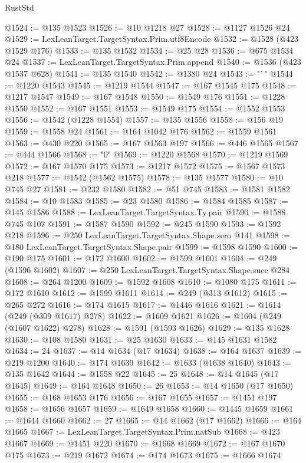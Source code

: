 \begin{lexlean}{RustStd}
\begin{coremodule}
{\begin{coremodule}
{{{{{{{{{{{{{{{{{{{{{{{{{{{{{{{{{{@1524 := @135 @1523
@1526 := @10 @1218 @27
@1528 := @1127 @1526 @24
@1529 := LexLeanTarget.TargetSyntax.Prim.utf8Encode
@1532 := @1528 (@423 @1529 @176)
@1533 := @135 @1532
@1534 := @25 @28
@1536 := @675 @1534 @24
@1537 := LexLeanTarget.TargetSyntax.Prim.append
@1540 := @1536 (@423 @1537 @628)
@1541 := @135 @1540
@1542 := @1380 @24
@1543 := "`"
@1544 := @1220 @1543
@1545 := @1219 @1544
@1547 := @167 @1545 @175
@1548 := @1217 @1547
@1549 := @167 @1548
@1550 := @1549 @176
@1551 := @1228 @1550
@1552 := @167 @1551
@1553 := @1549 @175
@1554 := @1552 @1553
@1556 := @1542 (@1228 @1554)
@1557 := @135 @1556
@1558 := @156 @19
@1559 := @1558 @24
@1561 := @164 @1042 @176
@1562 := @1559 @1561
@1563 := @430 @220
@1565 := @167 @1563 @197
@1566 := @446 @1565
@1567 := @444 @1566
@1568 := "0"
@1569 := @1220 @1568
@1570 := @1219 @1569
@1572 := @167 @1570 @175
@1573 := @1217 @1572
@1575 := @1567 @1573 @218
@1577 := @1542 (@1562 @1575)
@1578 := @135 @1577
@1580 := @10 @745 @27
@1581 := @232 @1580
@1582 := @51 @745
@1583 := @1581 @1582
@1584 := @10 @1583
@1585 := @23 @1580
@1586 := @1584 @1585
@1587 := @145 @1586
@1588 := LexLeanTarget.TargetSyntax.Ty.pair
@1590 := @1588 @745 @107
@1591 := @1587 @1590
@1592 := @245 @1590
@1593 := @1592 @218
@1596 := @250 LexLeanTarget.TargetSyntax.Shape.zero @141
@1598 := @180 LexLeanTarget.TargetSyntax.Shape.pair
@1599 := @1598 @1590
@1600 := @190 @175
@1601 := @172 @1600
@1602 := @1599 @1601
@1604 := @249 (@1596 @1602)
@1607 := @250 LexLeanTarget.TargetSyntax.Shape.succ @284
@1608 := @264 @1200
@1609 := @1592 @1608
@1610 := @1080 @175
@1611 := @172 @1610
@1612 := @1599 @1611
@1614 := @249 (@313 @1612)
@1615 := @265 @272
@1616 := @174 @1615
@1617 := @1446 @1616
@1621 := @1614 (@249 (@309 @1617) @278)
@1622 := @1609 @1621
@1626 := @1604 (@249 (@1607 @1622) @278)
@1628 := @1591 (@1593 @1626)
@1629 := @135 @1628
@1630 := @108 @1580
@1631 := @25 @1630
@1633 := @145 @1631 @1582
@1634 := 24
@1637 := @14 @1634 (@17 @1634)
@1638 := @164 @1637
@1639 := @219 @1200
@1640 := @174 @1639
@1642 := @1633 (@1638 @1640)
@1643 := @135 @1642
@1644 := @1558 @22
@1645 := 25
@1648 := @14 @1645 (@17 @1645)
@1649 := @164 @1648
@1650 := 26
@1653 := @14 @1650 (@17 @1650)
@1655 := @168 @1653 @176
@1656 := @167 @1655
@1657 := @1451 @197
@1658 := @1656 @1657
@1659 := @1649 @1658
@1660 := @1445 @1659
@1661 := @1644 @1660
@1662 := 27
@1665 := @14 @1662 (@17 @1662)
@1666 := @164 @1665
@1667 := LexLeanTarget.TargetSyntax.Prim.natSub
@1668 := @423 @1667
@1669 := @1451 @220
@1670 := @1668 @1669
@1672 := @167 @1670 @175
@1673 := @219 @1672
@1674 := @174 @1673
@1675 := @1666 @1674
}}}}}}}}}}}}}}}}}}}}}}}}}}}}}}}}}}
\end{coremodule}}
\end{coremodule}
\end{lexlean}
